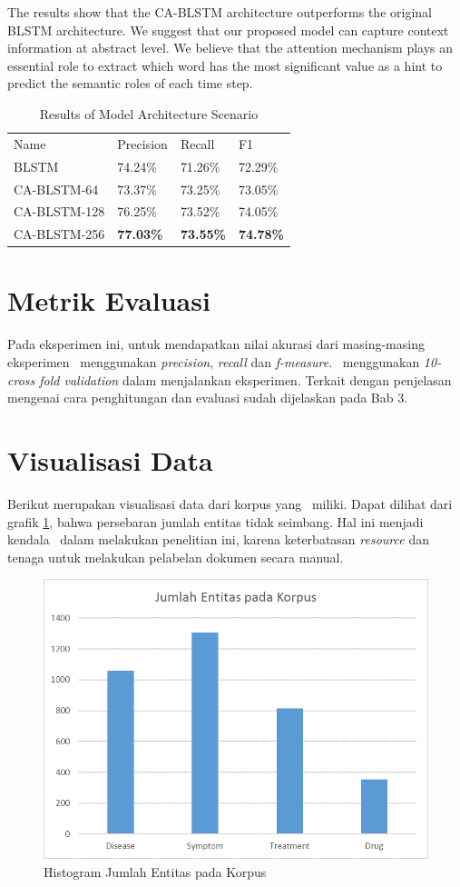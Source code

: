 The results show that the CA-BLSTM architecture outperforms the original BLSTM architecture. We suggest that our proposed model can capture context information at abstract level. We believe that the attention mechanism plays an essential role to extract which word has the most significant value as a hint to predict the semantic roles of each time step.

\begin{table}
	\caption{Results of Model Architecture Scenario}
	\label{tab:architecture_scenario}
	\begin{tabular}{llll}
		Name			&Precision					&Recall		&F1			\\
		BLSTM				&	74.24\%				&	71.26\%				&	72.29\%	\\
		CA-BLSTM-64			&	73.37\%				&	73.25\%				&	73.05\%	\\
		CA-BLSTM-128		&	76.25\%				&	73.52\%				&	74.05\%	\\
		CA-BLSTM-256		&	\textbf{77.03\%}	&	\textbf{73.55\%}	&	\textbf{74.78\%}\\
	\end{tabular}
\end{table}
\section{Metrik Evaluasi}
Pada eksperimen ini, untuk mendapatkan nilai akurasi dari masing-masing eksperimen \saya~menggunakan \textit{precision}, \textit{recall} dan \textit{f-measure}. \Saya~menggunakan \textit{10-cross fold validation} dalam menjalankan eksperimen. Terkait dengan penjelasan mengenai cara penghitungan dan evaluasi sudah dijelaskan pada Bab 3.

\section{Visualisasi Data}
Berikut merupakan visualisasi data dari korpus yang \saya~miliki. Dapat dilihat dari grafik \ref{fig:korpus}, bahwa persebaran jumlah entitas tidak seimbang. Hal ini menjadi kendala \saya~dalam melakukan penelitian ini, karena keterbatasan \textit{resource} dan tenaga untuk melakukan pelabelan dokumen secara manual.
\begin{figure}
	\centering
	\includegraphics[width=0.85\linewidth]{images/histogramentitaskorpus}
	\caption{Histogram Jumlah Entitas pada Korpus}
	\label{fig:korpus}
\end{figure}

